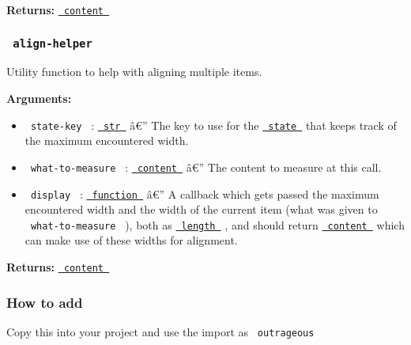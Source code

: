 \textbf{Returns:}
\href{https://typst.app/docs/reference/foundations/content/}{\texttt{\ content\ }}

\subsubsection{\texorpdfstring{\texttt{\ align-helper\ }}{ align-helper }}\label{align-helper}

Utility function to help with aligning multiple items.

\begin{Shaded}
\begin{Highlighting}[]
\end{Highlighting}
\end{Shaded}

\textbf{Arguments:}

\begin{itemize}
\tightlist
\item
  \texttt{\ state-key\ } :
  \href{https://typst.app/docs/reference/foundations/str/}{\texttt{\ str\ }}
  â€'' The key to use for the
  \href{https://typst.app/docs/reference/introspection/state/}{\texttt{\ state\ }}
  that keeps track of the maximum encountered width.
\item
  \texttt{\ what-to-measure\ } :
  \href{https://typst.app/docs/reference/foundations/content/}{\texttt{\ content\ }}
  â€'' The content to measure at this call.
\item
  \texttt{\ display\ } :
  \href{https://typst.app/docs/reference/foundations/function/}{\texttt{\ function\ }}
  â€'' A callback which gets passed the maximum encountered width and
  the width of the current item (what was given to
  \texttt{\ what-to-measure\ } ), both as
  \href{https://typst.app/docs/reference/layout/length/}{\texttt{\ length\ }}
  , and should return
  \href{https://typst.app/docs/reference/foundations/content/}{\texttt{\ content\ }}
  which can make use of these widths for alignment.
\end{itemize}

\textbf{Returns:}
\href{https://typst.app/docs/reference/foundations/content/}{\texttt{\ content\ }}

\subsubsection{How to add}\label{how-to-add}

Copy this into your project and use the import as
\texttt{\ outrageous\ }

